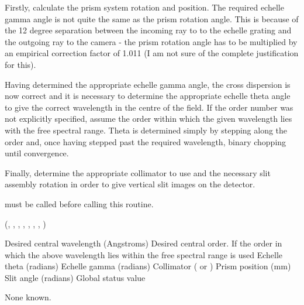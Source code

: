\begin{manroutinedescription}
     Firstly, calculate the prism system rotation and position. The required
     echelle gamma angle is not quite the same as the prism rotation angle.
     This is because of the 12 degree separation between the incoming ray to
     to the echelle grating and the outgoing ray to the camera - the prism
     rotation angle has to be multiplied by an empirical correction factor
     of 1.011 (I am not sure of the complete justification for this).

     Having determined the appropriate echelle gamma angle, the cross
     dispersion is now correct and it is necessary to determine the
     appropriate echelle theta angle to give the correct wavelength in the
     centre of the field. If the order number was not explicitly specified,
     assume the order within which the given wavelength lies with the free
     spectral range. Theta is determined simply by stepping along the order
     and, once having stepped past the required wavelength, binary chopping
     until convergence.

     Finally, determine the appropriate collimator to use and the necessary
     slit assembly rotation in order to give vertical slit images on the
     detector.

     {} must be called before calling this routine.

     {} {} ({}, {}%
, {}, {}, {}, {},
                                                        {}, %
{})

\begin{manparametertable}
Desired central wavelength
                                          (Angstroms)
%
 Desired central order. If {} the
                                          order in which the above wavelength
                                          lies within the free spectral range
                                          is used
Echelle theta (radians)
Echelle gamma (radians)
 Collimator ({} or {})
Prism position (mm)
Slit angle (radians)
 Global status value
\end{manparametertable}
     None known.


\end{manroutinedescription}
